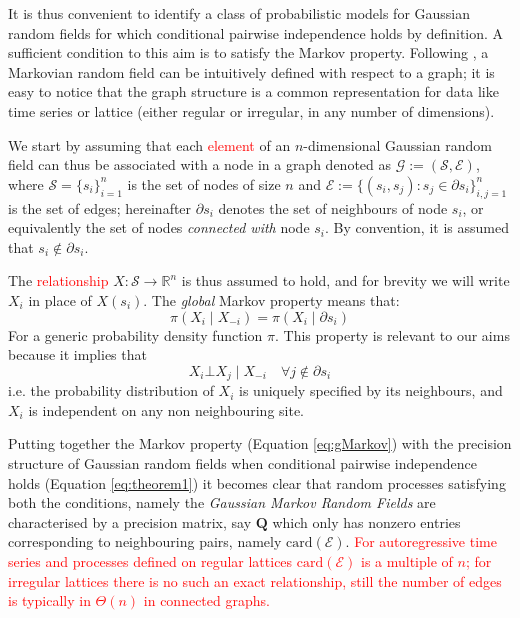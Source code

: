 \documentclass[openany]{book}
\begin{document}
It is thus convenient to identify a class of probabilistic models for Gaussian random fields for which conditional pairwise independence holds by definition. A sufficient condition to this aim is to satisfy the Markov property. Following \citep[][Section 2.2]{GMRFs}, a Markovian random field can be intuitively defined with respect to a graph; it is easy to notice that the graph structure is a common representation for data like time series or lattice (either regular or irregular, in any number of dimensions). 

We start by assuming that each \textcolor{red}{element} of an $n$-dimensional Gaussian random field can thus be associated with a node in a graph denoted as $\mathcal{G} :=(\mathcal{S}, \mathcal {E}) $, where $\mathcal{S} = \lbrace s_i \rbrace_{i=1}^n$ is the set of nodes of size $n$ and $\mathcal{E} := \lbrace (s_i, s_j) : s_j \in \partial s_i  \rbrace_{i,j=1}^n$ is the set of edges;  hereinafter $\partial s_i$ denotes the set of neighbours of node $s_i$, or equivalently the set of nodes \textit{connected with} node $s_i$. By convention, it is assumed that $s_i \notin \partial s_i$.

The \textcolor{red}{relationship} $X:\mathcal{S} \rightarrow \mathbb{R}^n$ is thus assumed to hold, and for brevity we will write $X_i$ in place of $X(s_i)$. The \textit{global} Markov property \citep{HammersleyClifford} means that:
%
\begin{equation}
\pi(X_i \mid X_{-i}) = \pi(X_i \mid \partial s_i)
    \label{eq:gMarkov}
\end{equation}
%
 For a generic probability density function $\pi$. %
 This property is relevant to our aims because it implies that
 $$
 X_i \bot X_j  \mid X_{-i} \quad \forall j \notin \partial s_i
 $$
i.e. the probability distribution of $X_i$ is uniquely specified by its neighbours, and $X_i$ is independent on any non neighbouring site.

Putting together the Markov property (Equation \ref{eq:gMarkov}) with the precision structure of Gaussian random fields when conditional pairwise independence holds (Equation \ref{eq:theorem1}) it becomes clear that random processes satisfying both the conditions, namely the \textit{Gaussian Markov Random Fields} are characterised by a precision matrix, say $\mathbf{Q}$ which only has nonzero entries corresponding to neighbouring pairs, namely $\mathrm{card}(\mathcal{E})$. \textcolor{red}{For autoregressive time series and processes defined on regular lattices $\mathrm{card}(\mathcal{E})$ is a multiple of $n$; for irregular lattices there is no such an exact relationship, still the number of edges is typically in $\mathcal{\Theta}(n)$ in connected graphs.}
\end{document}
